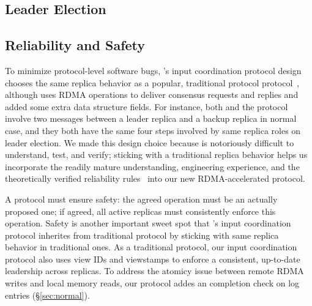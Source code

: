 




\subsection{Leader Election} \label{sec:election}



\subsection{Reliability and Safety} \label{sec:guarantees}

To minimize protocol-level software bugs, \xxx's input coordination protocol 
design chooses the same replica behavior as a popular, traditional 
\paxos protocol protocol~\cite{paxos:practical}, although \xxx uses RDMA 
operations to deliver consensus requests and replies and added some extra data 
structure fields. For instance, both \xxx and the 
protocol~\cite{paxos:practical} involve two messages between a leader replica 
and a backup replica in normal case, and they both have the same four steps 
involved by same replica roles on leader election. We made this design choice 
because \paxos is notoriously difficult to understand, test, and verify; 
sticking with a traditional replica behavior helps us incorporate the readily 
mature understanding, engineering experience, and the theoretically verified 
reliability rules~\cite{nsdi07} into our new RDMA-accelerated \paxos protocol.

A \paxos protocol must ensure safety: the agreed operation must be an actually 
proposed one; if agreed, all active replicas must consistently enforce this 
operation. Safety is another important sweet spot that \xxx's input 
coordination protocol inherites from traditional \paxos protocol by sticking 
with same replica behavior in traditional ones. As a traditional protocol, 
our input coordination protocol also uses view IDs and viewstamps to enforce a 
consistent, up-to-date leadership across replicas. To address the atomicy issue 
between remote RDMA writes and local memory reads, our protocol addes an 
completion check on log entries (\S\ref{sec:normal}).



